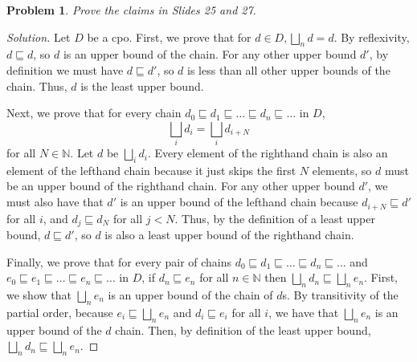 \documentclass{article}
\newtheorem{problem}{Problem}[section]}
\begin{document}
\begin{problem}
    Prove the claims in Slides 25 and 27.
\end{problem}
\begin{proof}[Solution]
    Let $D$ be a cpo. First, we prove that for $d\in D,\bigsqcup_n d = d$. By
    reflexivity, $d\sqsubseteq d$, so $d$ is an upper bound of the chain. For
    any other upper bound $d'$, by definition we must have $d\sqsubseteq d'$, so
    $d$ is less than all other upper bounds of the chain. Thus, $d$ is the least
    upper bound.

    \noindent
    Next, we prove that for every chain $d_0\sqsubseteq
    d_1\sqsubseteq\dots\sqsubseteq d_n\sqsubseteq\dots$ in $D$,
    \[
        \bigsqcup_i d_i=\bigsqcup_i d_{i+N}
    \]
    for all $N\in \mathbb{N}$. Let $d$ be $\bigsqcup_i d_i$. Every element of
    the righthand chain is also an element of the lefthand chain because it just
    skips the first $N$ elements, so $d$ must be an upper bound of the righthand
    chain. For any other upper bound $d'$, we must also have that $d'$ is an
    upper bound of the lefthand chain because $d_{i+N}\sqsubseteq d'$ for all
    $i$, and $d_j\sqsubseteq d_N$ for all $j<N$. Thus, by the definition of a
    least upper bound, $d\sqsubseteq d'$, so $d$ is also a least upper bound of
    the righthand chain.

    Finally, we prove that for every pair of chains $d_0\sqsubseteq
    d_1\sqsubseteq\dots\sqsubseteq d_n\sqsubseteq\dots$ and $e_0\sqsubseteq
    e_1\sqsubseteq\dots\sqsubseteq e_n\sqsubseteq\dots$ in $D$, if
    $d_n\sqsubseteq e_n$ for all $n\in \mathbb{N}$ then $\bigsqcup_n
    d_n\sqsubseteq\bigsqcup_n e_n$. First, we show that $\bigsqcup_n e_n$ is an
    upper bound of the chain of $d$s. By transitivity of the partial order,
    because $e_i\sqsubseteq\bigsqcup_n e_n$ and $d_i\sqsubseteq e_i$ for all
    $i$, we have that $\bigsqcup_n e_n$ is an upper bound of the $d$ chain.
    Then, by definition of the least upper bound, $\bigsqcup_n
    d_n\sqsubseteq\bigsqcup_n e_n$.
\end{proof}
\end{document}
